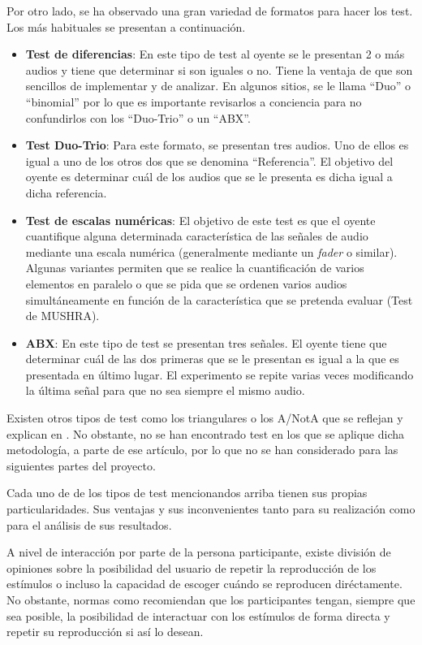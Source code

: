\documentclass[11pt,a4paper]{book}
\begin{document}
    Por otro lado, se ha observado una gran variedad de formatos para hacer los test. Los más habituales se presentan a continuación.
    
    \begin{itemize}
        \item \textbf{Test de diferencias}: En este tipo de test al oyente se le presentan 2 o más audios y tiene que determinar si son iguales o no. Tiene la ventaja de que son sencillos de implementar y de analizar. En algunos sitios, se le llama ``Duo'' o ``binomial'' por lo que es importante revisarlos a conciencia para no confundirlos con los ``Duo-Trio'' o un ``ABX''.
        \item \textbf{Test Duo-Trio}: Para este formato, se presentan tres audios. Uno de ellos es igual a  uno de los otros dos que se denomina ``Referencia''. El objetivo del oyente es determinar cuál de los audios que se le presenta es dicha igual a dicha referencia.
        \item \textbf{Test de escalas numéricas}: El objetivo de este test es que el oyente cuantifique alguna determinada característica de las señales de audio mediante una escala numérica (generalmente mediante un \textit{fader} o similar). Algunas variantes permiten que se realice la cuantificación de varios elementos en paralelo o que se pida que se ordenen varios audios simultáneamente en función de la característica que se pretenda evaluar (Test de MUSHRA).
        \item \textbf{ABX}: En este tipo de test se presentan tres señales. El oyente tiene que determinar cuál de las dos primeras que se le presentan es igual a la que es presentada en último lugar. El experimento se repite varias veces modificando la última señal para que no sea siempre el mismo audio. 
    \end{itemize}
    Existen otros tipos de test como los triangulares o los A/NotA que se reflejan y explican en \cite{delaPrida2021}. No obstante, no se han encontrado test en los que se aplique dicha metodología, a parte de ese artículo, por lo que no se han considerado para las siguientes partes del proyecto.
    
    Cada uno de de los tipos de test mencionandos arriba tienen sus propias particularidades. Sus ventajas y sus inconvenientes tanto para su realización como para el análisis de sus resultados.
    
    A nivel de interacción por parte de la persona participante, existe división de opiniones sobre la posibilidad del usuario de repetir la reproducción de los estímulos o incluso la capacidad de escoger cuándo se reproducen diréctamente. No obstante, normas como \cite{UIT1116,UIT1534, UIT1284,EBU3286, UIT1285, UIT1286} recomiendan que los participantes tengan, siempre que sea posible, la posibilidad de interactuar con los estímulos de forma directa y repetir su reproducción si así lo desean.
    
\end{document}
